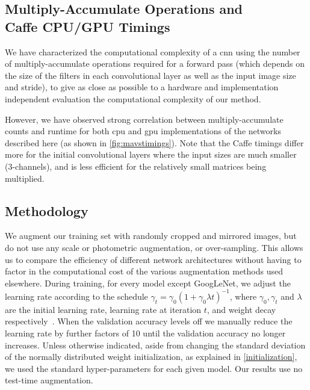 \documentclass[thesis]{subfiles}
\begin{document}
    \subsection[Multiply-Accumulate Operations and Caffe CPU/GPU Timings]{Multiply-Accumulate Operations and\\Caffe CPU/GPU Timings}\label{mavstimings}
    We have characterized the computational complexity of a \gls{cnn} using the number of multiply-accumulate operations required for a forward pass (which depends on the size of the filters in each convolutional layer as well as the input image size and stride), to give as close as possible to a hardware and implementation independent evaluation the computational complexity of our method.
    
    However, we have observed strong correlation between multiply-accumulate counts and runtime for both \gls{cpu} and \gls{gpu} implementations of the networks described here (as shown in \cref{fig:mavstimings}). Note that the Caffe timings differ more for the initial convolutional layers where the input sizes are much smaller (3-channels), and  is less efficient for the relatively small matrices being multiplied.
    
    \subsection{Methodology}
    We augment our training set with randomly cropped and mirrored images, but do not use any scale or photometric augmentation, or over-sampling. This allows us to compare the efficiency of different network architectures without having to factor in the computational cost of the various augmentation methods used elsewhere. During training, for every model except GoogLeNet, we adjust the learning rate according to the schedule $\gamma_t = \gamma_0(1+\gamma_0\lambda t)^{-1}$, where $\gamma_0,\gamma_t$ and $\lambda$ are the initial learning rate, learning rate at iteration $t$, and weight decay respectively~\citep{Bottou2012sgdtricks}. When the validation accuracy levels off we manually reduce the learning rate by further factors of 10 until the validation accuracy no longer increases. Unless otherwise indicated, aside from changing the standard deviation of the normally distributed weight initialization, as explained in \cref{initialization}, we used the standard hyper-parameters for each given model. Our results use no test-time augmentation.  
    
\end{document}
